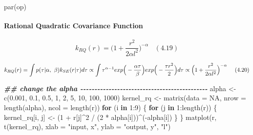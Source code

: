 \documentclass[
]{article}
\newenvironment{Shaded}{\begin{snugshade}}{\end{snugshade}}
\newcommand{\AttributeTok}[1]{\textcolor[rgb]{0.77,0.63,0.00}{#1}}
\newcommand{\ConstantTok}[1]{\textcolor[rgb]{0.00,0.00,0.00}{#1}}
\newcommand{\ControlFlowTok}[1]{\textcolor[rgb]{0.13,0.29,0.53}{\textbf{#1}}}
\newcommand{\DecValTok}[1]{\textcolor[rgb]{0.00,0.00,0.81}{#1}}
\newcommand{\DocumentationTok}[1]{\textcolor[rgb]{0.56,0.35,0.01}{\textbf{\textit{#1}}}}
\newcommand{\FloatTok}[1]{\textcolor[rgb]{0.00,0.00,0.81}{#1}}
\newcommand{\FunctionTok}[1]{\textcolor[rgb]{0.00,0.00,0.00}{#1}}
\newcommand{\NormalTok}[1]{#1}
\newcommand{\OtherTok}[1]{\textcolor[rgb]{0.56,0.35,0.01}{#1}}
\newcommand{\SpecialCharTok}[1]{\textcolor[rgb]{0.00,0.00,0.00}{#1}}
\newcommand{\StringTok}[1]{\textcolor[rgb]{0.31,0.60,0.02}{#1}}
\begin{document}
\begin{Shaded}
\begin{Highlighting}[]
\FunctionTok{par}\NormalTok{(op)}
\end{Highlighting}
\end{Shaded}

\hypertarget{rational-quadratic-covariance-function}{%
\paragraph{Rational Quadratic Covariance
Function}\label{rational-quadratic-covariance-function}}

\[
k_{RQ}(r) = \Big(1 + \frac {r^2} {2\alpha l^2} \Big)^{-\alpha}
\ \ \ \ (4.19)
\]

\[
k_{RQ}(r) = \int p(\tau|\alpha,\ \beta)k_{SE}(r|\tau) d\tau\\
\propto \int \tau^{\alpha -1} 
exp \Big(- \frac {\alpha \tau} \beta \Big)
exp \Big(- \frac {\tau r^2} 2\Big) d\tau\\
\propto \Big(1 + \frac {r^2} {2\alpha l^2}\Big)^{-\alpha}
\ \ \ \ (4.20)
\]

\begin{Shaded}
\begin{Highlighting}[]
\DocumentationTok{\#\# change the alpha {-}{-}{-}{-}{-}{-}{-}{-}{-}{-}{-}{-}{-}{-}{-}{-}{-}{-}{-}{-}{-}{-}{-}{-}{-}{-}{-}{-}{-}{-}{-}{-}{-}{-}{-}{-}{-}{-}{-}{-}{-}{-}{-}{-}{-}}
\NormalTok{alpha }\OtherTok{\textless{}{-}} \FunctionTok{c}\NormalTok{(}\FloatTok{0.001}\NormalTok{, }\FloatTok{0.1}\NormalTok{, }\FloatTok{0.5}\NormalTok{,}
          \DecValTok{1}\NormalTok{, }\DecValTok{2}\NormalTok{, }\DecValTok{5}\NormalTok{,}
          \DecValTok{10}\NormalTok{, }\DecValTok{100}\NormalTok{, }\DecValTok{1000}\NormalTok{)}
\NormalTok{kernel\_rq }\OtherTok{\textless{}{-}} \FunctionTok{matrix}\NormalTok{(}\AttributeTok{data =} \ConstantTok{NA}\NormalTok{, }\AttributeTok{nrow =} \FunctionTok{length}\NormalTok{(alpha), }\AttributeTok{ncol =} \FunctionTok{length}\NormalTok{(r))}
\ControlFlowTok{for}\NormalTok{ (i }\ControlFlowTok{in} \DecValTok{1}\SpecialCharTok{:}\DecValTok{9}\NormalTok{) \{}
  \ControlFlowTok{for}\NormalTok{ (j }\ControlFlowTok{in} \DecValTok{1}\SpecialCharTok{:}\FunctionTok{length}\NormalTok{(r)) \{}
\NormalTok{    kernel\_rq[i, j] }\OtherTok{\textless{}{-}}\NormalTok{ (}\DecValTok{1} \SpecialCharTok{+}\NormalTok{ r[j]}\SpecialCharTok{\^{}}\DecValTok{2} \SpecialCharTok{/}\NormalTok{ (}\DecValTok{2} \SpecialCharTok{*}\NormalTok{ alpha[i]))}\SpecialCharTok{\^{}}\NormalTok{(}\SpecialCharTok{{-}}\NormalTok{alpha[i])}
\NormalTok{  \}}
\NormalTok{\}}
\FunctionTok{matplot}\NormalTok{(r, }\FunctionTok{t}\NormalTok{(kernel\_rq), }
        \AttributeTok{xlab =} \StringTok{"input, x"}\NormalTok{, }\AttributeTok{ylab =} \StringTok{"output, y"}\NormalTok{,}
        \StringTok{"l"}\NormalTok{)}
\end{Highlighting}
\end{Shaded}
\end{document}
